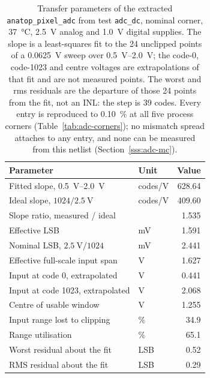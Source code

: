 \begin{table}[htbp]
  \centering
  \caption[{Transfer parameters of the extracted \texttt{anatop\_pixel\_adc}, test \texttt{adc\_dc},\,\dots}]{Transfer parameters of the extracted \texttt{anatop\_pixel\_adc} from test \texttt{adc\_dc}, nominal corner, \SI{37}{\celsius}, \SI{2.5}{\volt} analog and \SI{1.0}{\volt} digital supplies. The slope is a least-squares fit to the 24 unclipped points of a \SI{0.0625}{\volt} sweep over \SIrange{0.5}{2.0}{\volt}; the code-0, code-1023 and centre voltages are extrapolations of that fit and are not measured points. The worst and rms residuals are the departure of those 24 points from the fit, not an INL: the step is \num{39} codes. Every entry is reproduced to \SI{0.10}{\percent} at all five process corners (Table~\ref{tab:adc-corners}); no mismatch spread attaches to any entry, and none can be measured from this netlist (Section~\ref{sss:adc-mc}).}
  \label{tab:adc-transfer}
  \begin{tabular}{llr}
    \toprule
    Parameter & Unit & Value \\
    \midrule
    Fitted slope, \SIrange{0.5}{2.0}{\volt} & codes/V & 628.64 \\
    Ideal slope, \(1024/\SI{2.5}{\volt}\)   & codes/V & 409.60 \\
    Slope ratio, measured / ideal           &         & 1.535 \\
    Effective LSB                           & \si{\milli\volt} & 1.591 \\
    Nominal LSB, \(\SI{2.5}{\volt}/1024\)   & \si{\milli\volt} & 2.441 \\
    Effective full-scale input span         & \si{\volt} & 1.627 \\
    Input at code 0, extrapolated           & \si{\volt} & 0.441 \\
    Input at code 1023, extrapolated        & \si{\volt} & 2.068 \\
    Centre of usable window                 & \si{\volt} & 1.255 \\
    Input range lost to clipping            & \si{\percent} & 34.9 \\
    Range utilisation & \si{\percent} & 65.1 \\
    \midrule
    Worst residual about the fit            & LSB & 0.52 \\
    RMS residual about the fit & LSB & 0.29 \\
    \bottomrule
  \end{tabular}
\end{table}

